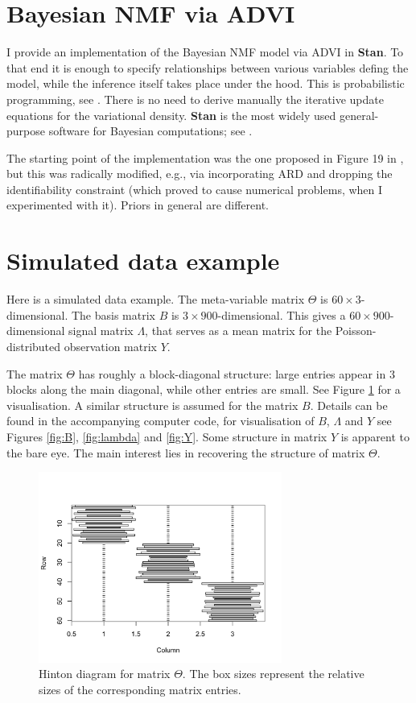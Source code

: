\documentclass[]{article}
\begin{document}
\section{Bayesian NMF via ADVI}

I provide an implementation of the Bayesian NMF model via ADVI in {\bf Stan}. To that end it is enough to specify relationships between various variables defing the model, while the inference itself takes place under the hood. This is probabilistic programming, see \citet{carpenter2017}. There is no need to derive manually the iterative update equations for the variational density. {\bf Stan} is the most widely used general-purpose software for Bayesian computations; see \citet{strumbelj2024}.

The starting point of the implementation was the one proposed in Figure 19 in \citet{kucukelbir2017}, but this was radically modified, e.g., via incorporating ARD and dropping the identifiability constraint (which proved to cause numerical problems, when I experimented with it). Priors in general are different.

\section{Simulated data example}

Here is a simulated data example. The meta-variable matrix $\Theta$ is $60 \times 3$-dimensional. The basis matrix $B$ is $3 \times 900$-dimensional. This gives a $60 \times 900$-dimensional signal matrix $\Lambda$, that serves as a mean matrix for the Poisson-distributed observation matrix $Y$.

The matrix $\Theta$ has roughly a block-diagonal structure: large entries appear in 3 blocks along the main diagonal, while other entries are small. See Figure \ref{fig:theta} for a visualisation. A similar structure is assumed for the matrix $B$. Details can be found in the accompanying computer code, for visualisation of $B$, $\Lambda$ and $Y$ see Figures \ref{fig:B}, \ref{fig:lambda} and \ref{fig:Y}. Some structure in matrix $Y$ is apparent to the bare eye. The main interest lies in recovering the structure of matrix $\Theta.$

\begin{figure}
	\centering
	\includegraphics[width=8cm]{theta.png}
	\caption{Hinton diagram for matrix $\Theta$. The box sizes represent the relative sizes of the corresponding matrix entries.}
	\label{fig:theta}
\end{figure}
\end{document}

